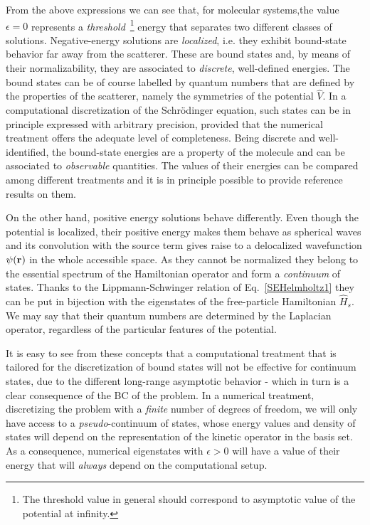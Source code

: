\documentclass[reprint,aps,prb]{revtex4-1}
\renewcommand{\r}{{\bf r}}
\newcommand{\op}[1]{\hat {#1}}
\begin{document}
From the above expressions we can see that, for molecular systems,the value $\epsilon=0$
represents a \emph{threshold}~\footnote{The threshold value in general should correspond to asymptotic value of the potential at infinity.} 
energy that separates two different classes of solutions.
Negative-energy solutions are \emph{localized}, i.e. they exhibit bound-state behavior far away from the scatterer.
These are bound states and, by means of their normalizability, they are associated to \emph{discrete}, well-defined energies.
The bound states can be of course labelled by quantum numbers that are defined by the properties of the scatterer, namely the
symmetries of the potential $\op V$.
In a computational discretization of the Schr\"odinger equation, such states can be in principle expressed with arbitrary precision, 
provided that the numerical treatment offers the adequate level of completeness. 
Being discrete and well-identified, the bound-state energies are a property of the molecule and can be associated to \emph{observable}
quantities. The values of their energies can be compared among different treatments and it is in principle possible to
provide reference results on them.


On the other hand, positive energy solutions behave differently. 
Even though the potential is localized, their positive energy makes them behave 
as spherical waves and its convolution with the source term  gives raise to a delocalized wavefunction $\psi(\r)$ 
in the whole accessible space.
As they cannot be normalized they belong to the essential spectrum of the Hamiltonian operator and form a \emph{continuum} of states.
Thanks to the Lippmann-Schwinger relation of Eq.~\eqref{SEHelmholtz1} they can be put in bijection with the eigenstates of the 
free-particle Hamiltonian $\op H_s$. We may say that their quantum numbers are determined by the Laplacian operator, 
regardless of the particular features of the potential.

It is easy to see from these concepts that a computational treatment that is tailored for the discretization of bound states
will not be effective for continuum states, due to the different long-range asymptotic behavior - which in turn is a clear consequence of the 
BC of the problem. In a numerical treatment, discretizing the problem with a \emph{finite}
number of degrees of freedom, we will only have access to a \emph{pseudo}-continuum of states,
whose energy values and density of states will depend on the representation of the kinetic operator
in the basis set. As a consequence, numerical eigenstates with $\epsilon > 0$ will have a value of their energy that will \emph{always}
depend on the computational setup.
\end{document}
